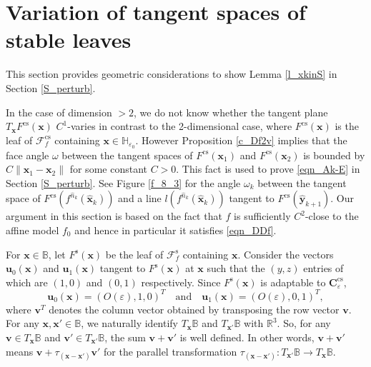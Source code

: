 \documentclass{amsart}
\theoremstyle{definition}
\numberwithin{equation}{section}
\numberwithin{figure}{section}
\begin{document}
\section{Variation of tangent spaces of stable leaves}\label{S_variation}

This section provides geometric considerations to show Lemma \ref{l_xkinS} in Section \ref{S_perturb}.

In the case of dimension $>2$, we do not know whether the tangent plane 
$T_{\boldsymbol{x}}F^{\mathrm{cs}}(\boldsymbol{x})$ $C^1$-varies in contrast to the  
2-dimensional case, where $F^{\mathrm{cs}}(\boldsymbol{x})$ is the leaf of $\mathcal{F}_f^{\mathrm{cs}}$ containing $\boldsymbol{x}\in \mathbb{H}_{\varepsilon_0}$.
However Proposition \ref{c_Df2v} implies that the face angle $\omega$ between 
the tangent spaces of $F^{\mathrm{cs}}(\boldsymbol{x}_1)$ and $F^{\mathrm{cs}}(\boldsymbol{x}_2)$ is bounded by 
$C\|\boldsymbol{x}_1-\boldsymbol{x}_2\|$ for some constant $C>0$.
This fact is used to prove \eqref{eqn_Ak-E} in Section \ref{S_perturb}.
See Figure \ref{f_8_3} for the angle $\omega_k$ between the tangent space of 
$F^{\mathrm{cs}}(f^{\widehat{n}_k}(\widehat{\boldsymbol{x}}_k))$ and a line $l(f^{\widehat n_k}(\widehat{\boldsymbol{x}}_k))$ tangent to $F^{\mathrm{cs}}(\widehat{\boldsymbol{y}}_{k+1})$.
Our argument in this section is based on the fact that $f$ is sufficiently $C^2$-close to the affine model $f_0$ and 
hence in particular it satisfies \eqref{eqn_DDf}.




For $\boldsymbol{x}\in \mathbb{B}$, let $F^{\mathrm{s}}(\boldsymbol{x})$ be the leaf of $\mathcal{F}_f^{\mathrm{s}}$ containing $\boldsymbol{x}$.
Consider the vectors $\boldsymbol{u}_0(\boldsymbol{x})$ and $\boldsymbol{u}_1(\boldsymbol{x})$ tangent to $F^{\mathrm{s}}(\boldsymbol{x})$ at $\boldsymbol{x}$ 
such that the $(y,z)$ entries of which are $(1,0)$ and $(0,1)$ respectively.
Since $F^{\mathrm{s}}(\boldsymbol{x})$ is adaptable to $\boldsymbol{C}_{\varepsilon}^{\mathrm{cs}}$,  
\begin{equation}\label{eqn_u0u1}
\boldsymbol{u}_0(\boldsymbol{x})=(O(\varepsilon),1,0)^T\quad\text{and}\quad\boldsymbol{u}_1(\boldsymbol{x})=(O(\varepsilon),0,1)^T,
\end{equation}
where $\boldsymbol{v}^T$ denotes the column vector obtained by transposing the row vector $\boldsymbol{v}$.
For any $\boldsymbol{x},\boldsymbol{x}'\in \mathbb{B}$, we naturally identify $T_{\boldsymbol{x}}\mathbb{B}$ and $T_{\boldsymbol{x}'}\mathbb{B}$ with $\mathbb{R}^3$.
So, for any $\boldsymbol{v}\in T_{\boldsymbol{x}} \mathbb{B}$ and $\boldsymbol{v}'\in T_{\boldsymbol{x}'} \mathbb{B}$, the sum $\boldsymbol{v}+ \boldsymbol{v}'$ is well 
defined.
In other words, $\boldsymbol{v}+\boldsymbol{v}'$ means $\boldsymbol{v}+ \tau_{(\boldsymbol{x}-\boldsymbol{x}')}\boldsymbol{v}'$ for 
the parallel transformation $\tau_{(\boldsymbol{x}-\boldsymbol{x}')}:T_{\boldsymbol{x}'}\mathbb{B}\longrightarrow T_{\boldsymbol{x}}\mathbb{B}$.
\end{document}
